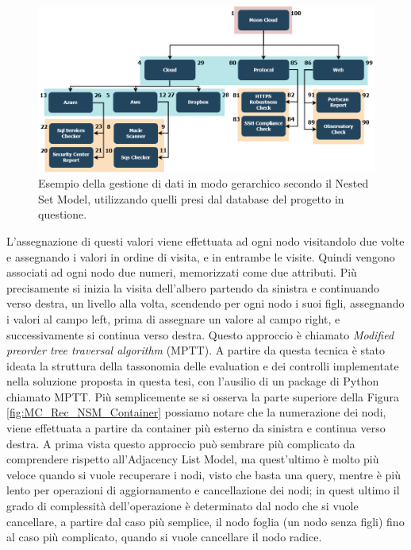\begin{figure}[ht!]
    \includegraphics[scale=0.40]{images/MC_Rec_NSM_Tree.png}
    \caption{Esempio della gestione di dati in modo gerarchico secondo il Nested Set Model, utilizzando quelli presi dal database del 
    progetto in questione.}
    \label{fig:MC_Rec_NSM_Tree}
\end{figure}
\hfill\break
L'assegnazione di questi valori viene effettuata ad ogni nodo visitandolo due volte e assegnando i valori in ordine di visita, e in entrambe le visite. 
Quindi vengono associati ad ogni nodo due numeri, memorizzati come due attributi.
Più precisamente si inizia la visita dell'albero partendo da sinistra e continuando verso destra, un livello alla volta, scendendo per ogni
nodo i suoi figli, assegnando i valori al campo left, prima di assegnare un valore al campo right, e successivamente si continua verso 
destra. Questo approccio è chiamato \textit{Modified preorder tree traversal algorithm} (MPTT). A partire da questa tecnica è stato 
ideata la struttura della tassonomia delle evaluation e dei controlli implementate nella soluzione proposta in questa tesi, con 
l'ausilio di un package di Python chiamato MPTT.\hfill\break
Più semplicemente se si osserva la parte superiore della Figura \ref{fig:MC_Rec_NSM_Container} possiamo notare che la numerazione dei nodi, viene
effettuata a partire da container più esterno da sinistra e continua verso destra.\hfill\break
A prima vista questo approccio può sembrare più complicato da comprendere rispetto all'Adjacency List Model, ma quest'ultimo è
molto più veloce quando si vuole recuperare i nodi, visto che basta una query, mentre è più lento per operazioni di aggiornamento e 
cancellazione dei nodi; in quest ultimo il grado di complessità dell'operazione è determinato dal nodo che si vuole cancellare, a 
partire dal caso più semplice, il nodo foglia (un nodo senza figli) fino al caso più complicato, quando si vuole cancellare il nodo 
radice.
%
\newpage
%

